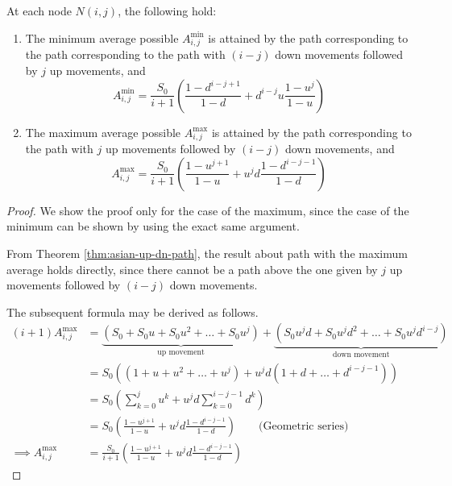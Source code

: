 \begin{crr}
	\label{crr:asian-up-dn-path}
	At each node $ N(i,j) $, the following hold:
	\begin{enumerate}
	\item The minimum average possible $ A_{i,j}^{\min} $ is attained by the path corresponding to the path corresponding to the path with $(i-j)$ down movements followed by $j$ up movements, and
		\begin{equation}	\label{eq:asian-Amin}
			A_{i,j}^{\min} = \frac{S_0}{i+1} \left( \frac{1 - d^{i-j+1}}{1-d} + d^{i-j} u \frac{1 - u^{j}}{1-u} \right)
		\end{equation}
	\item The maximum average possible $ A_{i,j}^{\max} $ is attained by the path corresponding to the path with $j$ up movements followed by $(i-j)$ down movements, and
		\begin{equation} \label{eq:asian-Amax}
			A_{i,j}^{\max} = \frac{S_0}{i+1} \left( \frac{1 - u^{j+1}}{1-u} + u^{j} d \frac{1 - d^{i-j-1}}{1-d} \right)
		\end{equation}
	\end{enumerate}
\end{crr}

\begin{proof}
	We show the proof only for the case of the maximum, since the case of the minimum can be shown by using the exact same argument.
	
	From Theorem \ref{thm:asian-up-dn-path}, the result about path with the maximum average holds directly, since there cannot be a path above the one given by $j$ up movements followed by $(i-j)$ down movements.
	
	The subsequent formula may be derived as follows.
	\begin{align*}
		(i+1) A_{i,j}^{\max} &= \underbrace{ ( S_0 + S_0 u + S_0 u^2 + \dots + S_0 u^j ) }_\text{up movement} + \underbrace{ ( S_0 u^j d + S_0 u^j d^2 + \dots + S_0 u^j d^{i-j} ) }_\text{down movement} \\
		&= S_0 ( (1 + u + u^2 + \dots + u^j ) + u^j d ( 1 + d + \dots + d^{i-j-1} ) ) \\
		&= S_0 \left( \sum_{k=0}^j u^k + u^j d \sum_{k=0}^{i-j-1} d^k \right) \\
		&= S_0 \left( \frac{1 - u^{j+1}}{1-u} + u^{j} d \frac{1 - d^{i-j-1}}{1-d} \right) \qquad \text{(Geometric series)} \\
		\implies A_{i,j}^{\max} &= \frac{S_0}{i+1} \left( \frac{1 - u^{j+1}}{1-u} + u^{j} d \frac{1 - d^{i-j-1}}{1-d} \right)
	\end{align*}
\end{proof}

